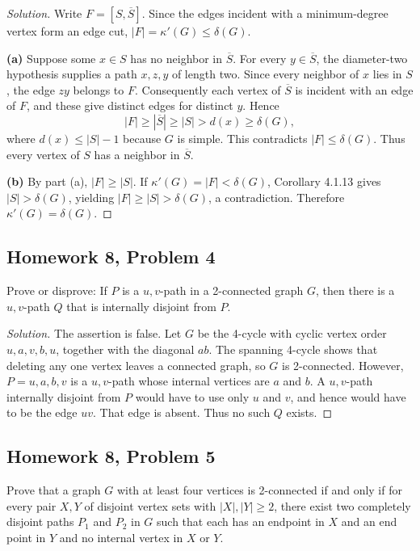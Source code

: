 \documentclass[12pt]{amsart}
\newenvironment{solution}{\begin{proof}[Solution]}{\end{proof}}
\begin{document}
    \begin{solution}

        Write $F=[S,\overline S]$. Since the edges incident with a
        minimum-degree vertex form an edge cut, $|F|=\kappa'(G)\le\delta(G)$.

        \textbf{(a)} Suppose some $x\in S$ has no neighbor in
        $\overline S$. For every $y\in\overline S$, the diameter-two
        hypothesis supplies a path $x,z,y$ of length two. Since every
        neighbor of $x$ lies in $S$, the edge $zy$ belongs to $F$.
        Consequently each vertex of $\overline S$ is incident with an
        edge of $F$, and these give distinct edges for distinct $y$.
        Hence
        \[
            |F|\ge |\overline S|\ge |S|>d(x)\ge\delta(G),
        \]
        where $d(x)\le |S|-1$ because $G$ is simple. This contradicts
        $|F|\le\delta(G)$. Thus every vertex of $S$ has a neighbor in
        $\overline S$.

        \textbf{(b)} By part (a), $|F|\ge |S|$. If
        $\kappa'(G)=|F|<\delta(G)$, Corollary 4.1.13 gives
        $|S|>\delta(G)$, yielding
        $|F|\ge |S|>\delta(G)$, a contradiction. Therefore
        $\kappa'(G)=\delta(G)$.
    \end{solution}

    \subsection*{Homework 8, Problem 4} Prove or disprove: If $P$ is a $u,v$-path in a 2-connected graph $G$, then there
    is a $u,v$-path $Q$ that is internally disjoint from $P$.

    \begin{solution}

        The assertion is false. Let $G$ be the 4-cycle with cyclic
        vertex order $u,a,v,b,u$, together with the diagonal $ab$.
        The spanning 4-cycle shows that deleting any one vertex leaves
        a connected graph, so $G$ is 2-connected.
        However, $P=u,a,b,v$ is a $u,v$-path whose internal vertices
        are $a$ and $b$. A $u,v$-path internally disjoint from $P$
        would have to use only $u$ and $v$, and hence would have to be
        the edge $uv$. That edge is absent. Thus no such $Q$ exists.
    \end{solution}

    \subsection*{Homework 8, Problem 5} Prove that a graph $G$ with at least four vertices is 2-connected if and only if
    for every pair $X,Y$ of disjoint vertex sets with $|X|,|Y| \ge 2$, there exist two completely disjoint
    paths $P_1$ and $P_2$ in $G$ such that each has an endpoint in $X$ and an end point in $Y$ and
    no internal vertex in $X$ or $Y$.
\end{document}
